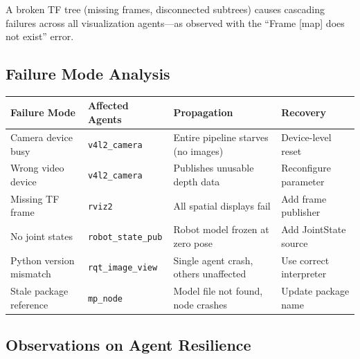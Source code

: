 \documentclass[11pt,a4paper]{article}
\begin{document}
A broken TF tree (missing frames, disconnected subtrees) causes cascading failures across all visualization agents---as observed with the ``Frame [map] does not exist'' error.

\subsection{Failure Mode Analysis}

\begin{center}
\begin{longtable}{p{3cm}p{3cm}p{4cm}p{3cm}}
\toprule
\textbf{Failure Mode} & \textbf{Affected Agents} & \textbf{Propagation} & \textbf{Recovery} \\
\midrule
Camera device busy & \texttt{v4l2\_camera} & Entire pipeline starves (no images) & Device-level reset \\
\addlinespace
Wrong video device & \texttt{v4l2\_camera} & Publishes unusable depth data & Reconfigure parameter \\
\addlinespace
Missing TF frame & \texttt{rviz2} & All spatial displays fail & Add frame publisher \\
\addlinespace
No joint states & \texttt{robot\_state\_pub} & Robot model frozen at zero pose & Add JointState source \\
\addlinespace
Python version mismatch & \texttt{rqt\_image\_view} & Single agent crash, others unaffected & Use correct interpreter \\
\addlinespace
Stale package reference & \texttt{mp\_node} & Model file not found, node crashes & Update package name \\
\bottomrule
\end{longtable}
\end{center}

\subsection{Observations on Agent Resilience}
\end{document}
